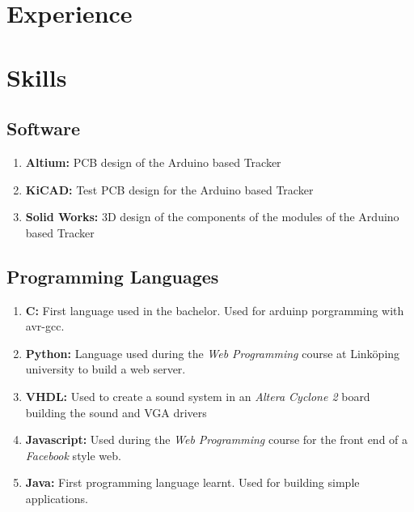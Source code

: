 \documentclass[letterpaper]{twentysecondcv-eng} %
\begin{document}
\section{Experience}

\begin{twenty} %

\end{twenty}

\section{Skills}
\subsection{Software}
\begin{enumerate}
	\item \textbf{Altium:} PCB design of the Arduino based Tracker
	\item \textbf{KiCAD:} Test PCB design for the Arduino based Tracker
	\item \textbf{Solid Works:} 3D design of the components of the modules of the Arduino based Tracker
\end{enumerate}

\subsection{Programming Languages}
\begin{enumerate}
	\item \textbf{C:} First language used in the bachelor. Used for arduinp porgramming with avr-gcc.
		\item \textbf{Python:} Language used during the {\it Web Programming} course at  Link\"oping university to build a web server.
	\item \textbf{VHDL:} Used to create a sound system in an {\it Altera Cyclone 2} board building the sound and VGA drivers
	\item \textbf{Javascript: } Used during the {\it Web Programming} course for the  front end of a {\it Facebook} style web.
	\item \textbf{Java: } First programming language learnt. Used for building simple applications.
\end{enumerate}
\end{document}
